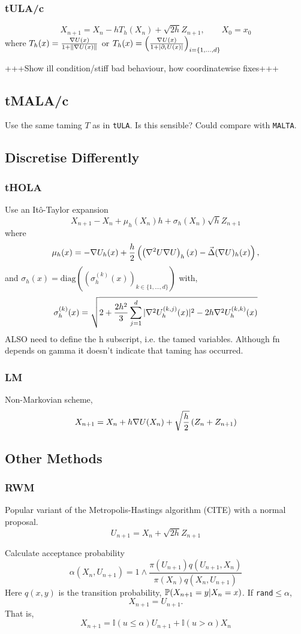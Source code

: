 \subsubsection{tULA/c}
\[X_{n+1} = X_n -h T_{h}(X_n) +\sqrt{2h} Z_{n+1},\qquad X_0= x_0 \]
where \(T_{h}(x) = \frac{\grad U(x)}{1+\|\grad U(x)\|}\) or \(T_{h}(x) =\left(\frac{\grad U(x)}{1+|\partial_i U(x)|}\right)_{i=\lbrace 1, \dots, d\rbrace} \)



+++Show ill condition/stiff bad behaviour, how coordinatewise fixes+++
\subsection{tMALA/c}
Use the same taming \(T\) as in \texttt{tULA}. Is this sensible? Could compare with \texttt{MALTA}.
%

\subsection{Discretise Differently}
\subsubsection{tHOLA}
\cite{tHOLA}
Use an It\^o-Taylor expansion
\[X_{n+1} - X_n + \mu_{h}(X_n)h +\sigma_{h}(X_n)\sqrt{h}Z_{n+1}\]
where
\[\mu_{h}(x) = -\grad U_{h}(x) +\frac{h}{2}\left( \left( \grad^2U\grad U\right)_{h}(x) - \vec{\Delta}(\grad U)_{h}(x)\right) ,\]
and \(\sigma_{h}(x) = \text{diag}\left(\left( \sigma_{h}^{(k)}(x)\right)_{k\in \lbrace 1,\dots,d\rbrace}\right)\) with,
\[\sigma_{h}^{(k)}(x) = \sqrt{2+\frac{2h^2}{3}\sum_{j=1}^d |\grad^2 U_{h}^{(k,j)}(x)|^2 - 2h \grad^2 U_{h}^{(k,k)}(x)}\]
ALSO need to define the h subscript, i.e. the tamed variables.  Although fn depends on gamma it doesn't indicate that taming has occurred.
\subsubsection{LM}
\cite{LM}
Non-Markovian scheme,
\[X_{n+1} = X_n +h \grad U(X_n) + \sqrt{\frac{h}{2}} \left(Z_n + Z_{n+1}\right) \]


\subsection{Other Methods}
\subsubsection{RWM}
Popular variant of the Metropolis-Hastings algorithm (CITE) with a normal proposal.
\[U_{n+1} = X_n + \sqrt{2h} Z_{n+1}\]

Calculate acceptance probability
\[\alpha(X_n,U_{n+1}) = 1\wedge \frac{\pi(U_{n+1})q(U_{n+1},X_n)}{\pi(X_n)q(X_n,U_{n+1})}\]
Here \(q(x,y)\) is the transition probability, \(\P(X_{n+1}=y | X_{n}=x)\). If \texttt{rand}\(\leq\alpha\),
\[X_{n+1} = U_{n+1}.\]
That is,
\[X_{n+1} = \mathbb{I}(u\leq \alpha)U_{n+1} +\mathbb{I}(u > \alpha)X_n \]
